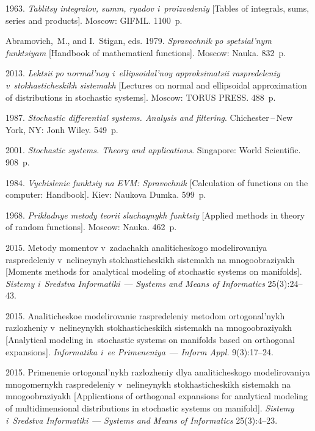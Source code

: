 \begin{multicols}{2}
{{\begin{thebibliography}{99}
 1963.
\textit{Tablitsy integralov, summ, ryadov i~proizvedeniy}
[Tables of integrals, sums, series and products]. Moscow: GIFML.  1100~p.

Abramovich,~M., and I.~Stigan, eds. 1979.
\textit{Spravochnik po spetsial'nym funktsiyam}
[Handbook of mathematical functions]. Moscow: Nauka. 832~p.

 2013.
\textit{Lektsii po normal'noy i~ellipsoidal'noy approksimatsii raspredeleniy 
v~stokhasticheskikh sistemakh}
[Lectures on normal and ellipsoidal approximation of distributions in stochastic 
systems]. Moscow: TORUS PRESS.  488~p.

1987. \textit{Stochastic differential systems.
Analysis and filtering}. Chichester\,--\,New York, NY: Jonh Wiley.
549~p.

 2001.  \textit{Stochastic systems. Theory and  applications}.
Singapore: World Scientific. 908~p.

 1984.
\textit{Vychislenie funktsiy na EVM: Spravochnik}
[Calculation of functions on the computer: Handbook]. Kiev: Naukova Dumka.  599~p.

 1968.
\textit{Prikladnye metody teorii sluchaynykh funktsiy}
[Applied methods in theory of random functions].  Moscow: Nauka.  462~p.

 2015.
Metody momentov v~zadachakh analiticheskogo modelirovaniya raspredeleniy 
v~nelineynyh stokhasticheskikh sistemakh na mno\-go\-ob\-ra\-zi\-yakh
[Moments methods for analytical modeling of stochastic systems on manifolds].
\textit{Sistemy i~Sredstva Informatiki}~---
\textit{Systems and Means of Informatics} 25(3):24--43.

 2015.
Analiticheskoe modelirovanie raspre\-deleniy metodom ortogonal'nykh razlozheniy 
v~ne\-li\-ney\-nykh stokhasticheskikh sistemakh na mno\-go\-ob\-ra\-zi\-yakh
[Analytical modeling in~stochastic systems on manifolds based on orthogonal expansions].
\textit{Informatika i~ee Primeneniya}~---
\textit{Inform Appl.} 9(3):17--24.

 2015.
Primenenie ortogonal'nykh raz\-lo\-zhe\-niy dlya analiticheskogo modelirovaniya 
mno\-go\-mer\-nykh raspredeleniy v~nelineynykh stokhasticheskikh sistemakh 
na mnogoobraziyakh
[Applications of orthogonal expansions for analytical modeling
of multidimensional distributions in stochastic systems on manifold].
\textit{Sistemy i~Sredstva Informatiki}~---
\textit{Systems and Means of Informatics} 25(3):4--23.
\end{thebibliography}

 }
 }

\end{multicols}

